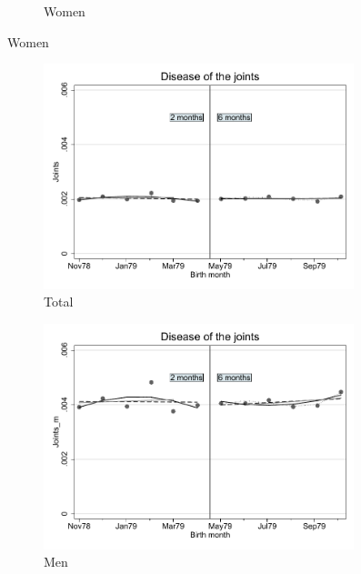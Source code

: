 \documentclass[a4paper ]{article}
\begin{document}
\begin{figure}[h!]
\begin{subfigure}[t]{0.31\textwidth}
		\caption{Women}
	\end{subfigure}
\end{figure}
\newpage
\begin{figure}[h]
	\centering
	\begin{subfigure}[t]{0.31\textwidth}
		\centering
		\includegraphics[width=0.99\textwidth]{R1_RD_Joints_fits}
		\caption{Total}		
	\end{subfigure}
	\begin{subfigure}[t]{0.31\textwidth}
		\centering
		\includegraphics[width=0.99\textwidth]{R1_RD_Joints_m_fits}
		\caption{Men}		
	\end{subfigure}
	\quad
	\begin{subfigure}[t]{0.31\textwidth}

\end{subfigure}
\end{figure}
\end{document}
